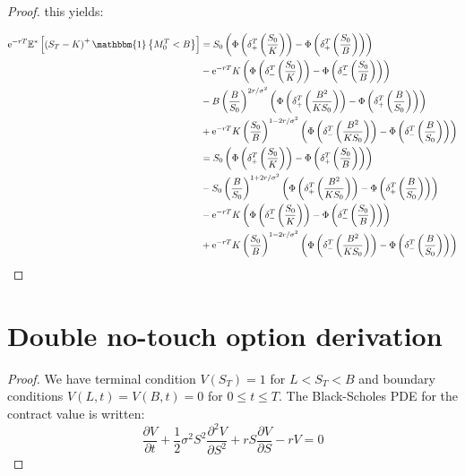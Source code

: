 \begin{appendices}
\begin{proof}
this yields:


$$
\begin{aligned}
\mathrm{e}^{-r T} \mathbb{E}^{*}\left[\left(S_{T}-K\right)^{+} \mathbbm{1}\left\{M_{0}^{T}<B\right\}\right]
&= S_{0}\left(\Phi\left(\delta_{+}^{T}\left(\frac{S_{0}}{K}\right)\right)-\Phi\left(\delta_{+}^{T}\left(\frac{S_{0}}{B}\right)\right)\right) \\
&-\mathrm{e}^{-r T} K\left(\Phi\left(\delta_{-}^{T}\left(\frac{S_{0}}{K}\right)\right)-\Phi\left(\delta_{-}^{T}\left(\frac{S_{0}}{B}\right)\right)\right) \\
&-B\left(\frac{B}{S_{0}}\right)^{2 r / \sigma^{2}}\left(\Phi\left(\delta_{+}^{T}\left(\frac{B^{2}}{K S_{0}}\right)\right)-\Phi\left(\delta_{+}^{T}\left(\frac{B}{S_{0}}\right)\right)\right) \\
&+\mathrm{e}^{-r T} K\left(\frac{S_{0}}{B}\right)^{1-2 r / \sigma^{2}}\left(\Phi\left(\delta_{-}^{T}\left(\frac{B^{2}}{K S_{0}}\right)\right)-\Phi\left(\delta_{-}^{T}\left(\frac{B}{S_{0}}\right)\right)\right) \\
&= S_{0}\left(\Phi\left(\delta_{+}^{T}\left(\frac{S_{0}}{K}\right)\right)-\Phi\left(\delta_{+}^{T}\left(\frac{S_{0}}{B}\right)\right)\right) \\
&-S_{0}\left(\frac{B}{S_{0}}\right)^{1+2 r / \sigma^{2}}\left(\Phi\left(\delta_{+}^{T}\left(\frac{B^{2}}{K S_{0}}\right)\right)-\Phi\left(\delta_{+}^{T}\left(\frac{B}{S_{0}}\right)\right)\right) \\
&-\mathrm{e}^{-r T} K\left(\Phi\left(\delta_{-}^{T}\left(\frac{S_{0}}{K}\right)\right)-\Phi\left(\delta_{-}^{T}\left(\frac{S_{0}}{B}\right)\right)\right) \\
&+\mathrm{e}^{-r T} K\left(\frac{S_{0}}{B}\right)^{1-2 r / \sigma^{2}}\left(\Phi\left(\delta_{-}^{T}\left(\frac{B^{2}}{K S_{0}}\right)\right)-\Phi\left(\delta_{-}^{T}\left(\frac{B}{S_{0}}\right)\right)\right) 
\end{aligned}
$$



\end{proof}



\section{Double no-touch option derivation}
\label{appendix:b}


\begin{proof}

We have terminal condition $V(S_T) = 1$ for $L < S_T < B$ and boundary conditions $V(L,t) = V(B,t) = 0$ for $0 \leq t \leq T$.\newline
The Black-Scholes PDE for the contract value is written:
\[
\dfrac{\partial V}{\partial t} + \dfrac{1}{2} \sigma^2 S^2 \dfrac{\partial^2 V}{\partial S^2} + rS \dfrac{\partial V}{\partial S} - rV = 0
\]


\end{proof}
\end{appendices}
